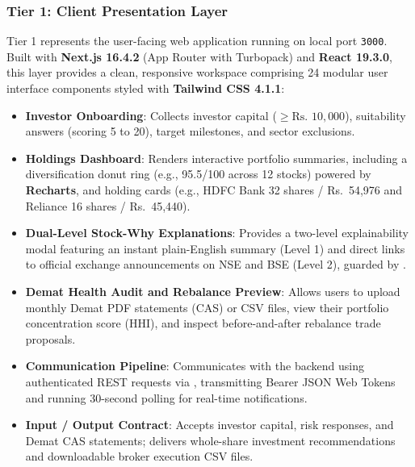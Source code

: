 \subsubsection{Tier 1: Client Presentation Layer}
Tier 1 represents the user-facing web application running on local port \texttt{3000}. Built with \textbf{Next.js 16.4.2} (App Router with Turbopack) and \textbf{React 19.3.0}, this layer provides a clean, responsive workspace comprising 24 modular user interface components styled with \textbf{Tailwind CSS 4.1.1}:
\begin{itemize}
    \item \textbf{Investor Onboarding}: Collects investor capital ($\ge \text{Rs.~}10{,}000$), suitability answers (scoring 5 to 20), target milestones, and sector exclusions.
    \item \textbf{Holdings Dashboard}: Renders interactive portfolio summaries, including a diversification donut ring (e.g., 95.5/100 across 12 stocks) powered by \textbf{Recharts}, and holding cards (e.g., HDFC Bank 32 shares / Rs.~54,976 and Reliance 16 shares / Rs.~45,440).
    \item \textbf{Dual-Level Stock-Why Explanations}: Provides a two-level explainability modal featuring an instant plain-English summary (Level 1) and direct links to official exchange announcements on NSE and BSE (Level 2), guarded by .
    \item \textbf{Demat Health Audit and Rebalance Preview}: Allows users to upload monthly Demat PDF statements (CAS) or CSV files, view their portfolio concentration score (HHI), and inspect before-and-after rebalance trade proposals.
    \item \textbf{Communication Pipeline}: Communicates with the backend using authenticated REST requests via , transmitting Bearer JSON Web Tokens and running 30-second polling for real-time notifications.
    \item \textbf{Input / Output Contract}: Accepts investor capital, risk responses, and Demat CAS statements; delivers whole-share investment recommendations and downloadable broker execution CSV files.
\end{itemize}

